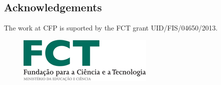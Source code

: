 \documentclass[a0,portrait]{a0poster}
\begin{document}
\begin{multicols}{3}
\vspace{-1cm}


\vspace{-1.5cm}
\section{Acknowledgements}

The work at CFP is suported by the FCT grant UID/FIS/04650/2013.
\vspace{-1cm}
\begin{figure}
\raggedleft
\includegraphics[scale=0.7]{fct.png}
\end{figure}

\end{multicols}

\makefooter
\end{document}

